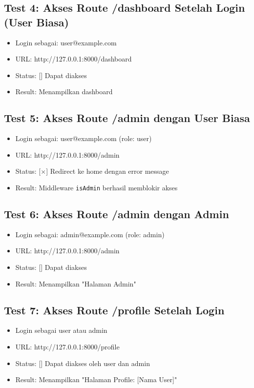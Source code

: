 \documentclass[a4paper,oneside,11pt]{book}
\begin{document}
\subsection{Test 4: Akses Route /dashboard Setelah Login (User Biasa)}
\begin{itemize}
    \item Login sebagai: user@example.com
    \item URL: http://127.0.0.1:8000/dashboard
    \item Status: [\checkmark] Dapat diakses
    \item Result: Menampilkan dashboard
\end{itemize}

\subsection{Test 5: Akses Route /admin dengan User Biasa}
\begin{itemize}
    \item Login sebagai: user@example.com (role: user)
    \item URL: http://127.0.0.1:8000/admin
    \item Status: [$\times$] Redirect ke home dengan error message
    \item Result: Middleware \texttt{isAdmin} berhasil memblokir akses
\end{itemize}

\subsection{Test 6: Akses Route /admin dengan Admin}
\begin{itemize}
    \item Login sebagai: admin@example.com (role: admin)
    \item URL: http://127.0.0.1:8000/admin
    \item Status: [\checkmark] Dapat diakses
    \item Result: Menampilkan "Halaman Admin"
\end{itemize}

\subsection{Test 7: Akses Route /profile Setelah Login}
\begin{itemize}
    \item Login sebagai user atau admin
    \item URL: http://127.0.0.1:8000/profile
    \item Status: [\checkmark] Dapat diakses oleh user dan admin
    \item Result: Menampilkan "Halaman Profile: [Nama User]"
\end{itemize}
\end{document}
